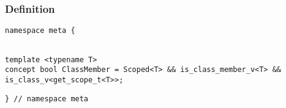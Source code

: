 
\subsubsection{Definition}

\begin{verbatim}
namespace meta {
\end{verbatim}
\begin{verbatim}

template <typename T>
concept bool ClassMember = Scoped<T> && is_class_member_v<T> && is_class_v<get_scope_t<T>>;

\end{verbatim}
\begin{verbatim}
} // namespace meta
\end{verbatim}
